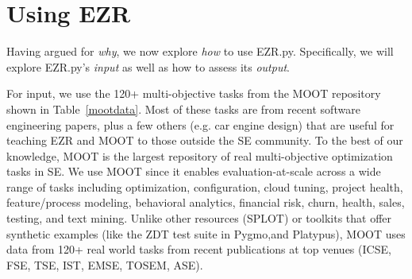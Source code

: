 \documentclass[AMA,STIX2COL]{WileyNJDv5}
\begin{document}




\section{ Using EZR}

Having argued for {\em why}, we now explore {\em how} to use EZR.py.  Specifically, we will explore EZR.py's {\em input} as well as how to assess its
{\em output}.
 
For input, we use the  120+ multi-objective tasks from the MOOT repository~\cite{menzies2025moot} shown in Table~\ref{mootdata}.
Most of these tasks are from recent software engineering papers, plus a few
others (e.g. car engine design) that are useful for teaching EZR and MOOT to those outside the SE community.  
 To the best of our knowledge, 
MOOT is the largest  repository of real multi-objective
optimization tasks in SE.  
We use MOOT since
it enables   evaluation-at-scale  across a   wide range of 
tasks including optimization, configuration,
cloud tuning, project health, feature/process
modeling, behavioral analytics,
financial risk, churn, health,   sales, testing, and text mining.
Unlike other 
resources (SPLOT) or   toolkits that offer synthetic
examples (like the ZDT test suite in Pygmo,and Platypus), 
MOOT uses data from 120+ real world tasks
 from recent publications   at  top venues (ICSE, FSE, TSE, IST, EMSE, TOSEM, ASE).
\end{document}
